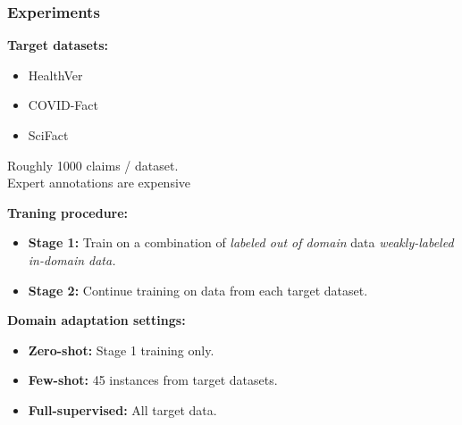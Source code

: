 \documentclass[13.5pt,aspecratio=169, xcolor=dvipsnames]{beamer}
\begin{document}
\begin{frame}
\onehalfspacing
    \frametitle{Experiments}
    \begin{minipage}{0.3\textwidth}
        \textbf{Target datasets:}
        \begin{itemize}
            \item HealthVer
            \item COVID-Fact
            \item SciFact
        \end{itemize}
    \end{minipage}
    \begin{minipage}{0.69\textwidth}
         {
        \begin{minipage}{0.75\textwidth}
            \begin{block}{}
                \hspace{0.5em} Roughly 1000 claims / dataset. \\
                \hspace{0.5em} Expert annotations are expensive
            \end{block}
        \end{minipage} 
        }
    \end{minipage}

    \bigskip
     {
        \textbf{Traning procedure:}
        \begin{itemize}
            \item \textbf{Stage 1:} Train on a combination of \textit{labeled out of domain} data \textit{weakly-labeled in-domain data.}
            \item \textbf{Stage 2:} Continue training on data from each target dataset. 
        \end{itemize}
    }
    \bigskip
    \vspace*{-1em}
     {
        \textbf{Domain adaptation settings:}
        \begin{itemize}
            \item \textbf{Zero-shot:} Stage 1 training only.
            \item \textbf{Few-shot:} 45 instances from target datasets.
            \item \textbf{Full-supervised:} All target data.
        \end{itemize}
    }



\end{frame}
\end{document}
